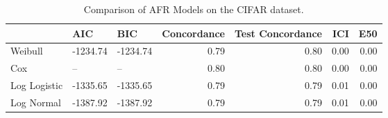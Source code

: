 \begin{table*}
\centering
\caption{Comparison of AFR Models on the CIFAR dataset.}
\label{tab:cifar}
\begin{tabular}{lllrrrr}
\toprule
 & AIC & BIC & Concordance & Test Concordance & ICI & E50 \\
\midrule
Weibull & -1234.74 & -1234.74 & 0.79 & 0.80 & 0.00 & 0.00 \\
Cox & -- & -- & 0.80 & 0.80 & 0.00 & 0.00 \\
Log Logistic & -1335.65 & -1335.65 & 0.79 & 0.79 & 0.01 & 0.00 \\
Log Normal & -1387.92 & -1387.92 & 0.79 & 0.79 & 0.01 & 0.00 \\
\bottomrule
\end{tabular}
\end{table*}
